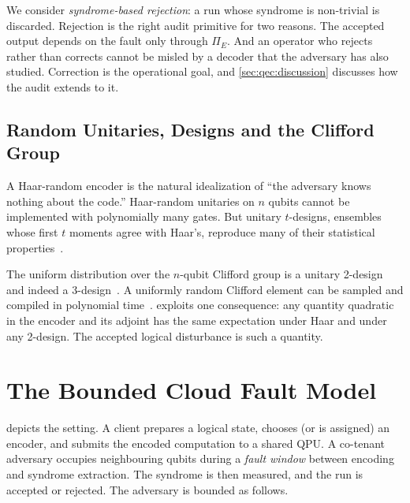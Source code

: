 We consider \emph{syndrome-based rejection}: a run whose syndrome is non-trivial is discarded. Rejection is the right audit primitive for two reasons. The accepted output depends on the fault only through $\Pi_E$. And an operator who rejects rather than corrects cannot be misled by a decoder that the adversary has also studied. Correction is the operational goal, and \cref{sec:qec:discussion} discusses how the audit extends to it.

\subsection{Random Unitaries, Designs and the Clifford Group}\label{sec:qec:designs}

A Haar-random encoder is the natural idealization of ``the adversary knows nothing about the code.'' Haar-random unitaries on $n$ qubits cannot be implemented with polynomially many gates. But unitary $t$-designs, ensembles whose first $t$ moments agree with Haar's, reproduce many of their statistical properties~\cite{dankert2009designs,gross2007designs}.

The uniform distribution over the $n$-qubit Clifford group is a unitary 2-design and indeed a 3-design~\cite{webb2016clifford3design}. A uniformly random Clifford element can be sampled and compiled in polynomial time~\cite{koenig2014clifford,bravyi2021hadamardfree}.  exploits one consequence: any quantity quadratic in the encoder and its adjoint has the same expectation under Haar and under any 2-design. The accepted logical disturbance is such a quantity.

\section{The Bounded Cloud Fault Model}\label{sec:qec:threat}

 depicts the setting. A client prepares a logical state, chooses (or is assigned) an encoder, and submits the encoded computation to a shared QPU. A co-tenant adversary occupies neighbouring qubits during a \emph{fault window} between encoding and syndrome extraction. The syndrome is then measured, and the run is accepted or rejected. The adversary is bounded as follows.


